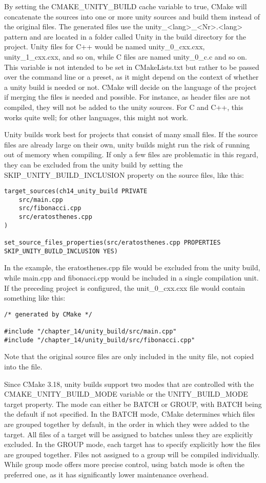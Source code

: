 By setting the CMAKE\_UNITY\_BUILD cache variable to true, CMake will concatenate the sources into one or more unity sources and build them instead of the original files. The generated files use the unity\_<lang>\_<Nr>.<lang> pattern and are located in a folder called Unity in the build directory for the project. Unity files for C++ would be named unity\_0\_cxx.cxx, unity\_1\_cxx.cxx, and so on, while C files are named unity\_0\_c.c and so on. This variable is not intended to be set in CMakeLists.txt but rather to be passed over the command line or a preset, as it might depend on the context of whether a unity build is needed or not. CMake will decide on the language of the project if merging the files is needed and possible. For instance, as header files are not compiled, they will not be added to the unity sources. For C and C++, this works quite well; for other languages, this might not work.

Unity builds work best for projects that consist of many small files. If the source files are already large on their own, unity builds might run the risk of running out of memory when compiling. If only a few files are problematic in this regard, they can be excluded from the unity build by setting the SKIP\_UNITY\_BUILD\_INCLUSION property on the source files, like this:

\begin{lstlisting}[style=styleCMake]
target_sources(ch14_unity_build PRIVATE
	src/main.cpp
	src/fibonacci.cpp
	src/eratosthenes.cpp
)

set_source_files_properties(src/eratosthenes.cpp PROPERTIES
SKIP_UNITY_BUILD_INCLUSION YES)
\end{lstlisting}

In the example, the eratosthenes.cpp file would be excluded from the unity build, while main.cpp and fibonacci.cpp would be included in a single compilation unit. If the preceding project is configured, the unit\_0\_cxx.cxx file would contain something like this:

\begin{lstlisting}[style=styleCXX]
/* generated by CMake */

#include "/chapter_14/unity_build/src/main.cpp"
#include "/chapter_14/unity_build/src/fibonacci.cpp"
\end{lstlisting}

Note that the original source files are only included in the unity file, not copied into the file.

Since CMake 3.18, unity builds support two modes that are controlled with the CMAKE\_UNITY\_BUILD\_MODE variable or the UNITY\_BUILD\_MODE target property. The mode can either be BATCH or GROUP, with BATCH being the default if not specified. In the BATCH mode, CMake determines which files are grouped together by default, in the order in which they were added to the target. All files of a target will be assigned to batches unless they are explicitly excluded. In the GROUP mode, each target has to specify explicitly how the files are grouped together. Files not assigned to a group will be compiled individually. While group mode offers more precise control, using batch mode is often the preferred one, as it has significantly lower maintenance overhead.

